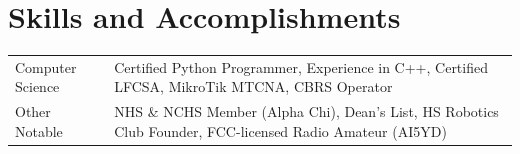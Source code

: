 \documentclass[a4paper,12pt]{article}
\begin{document}
\section{Skills and Accomplishments}
\begin{tabularx}{\linewidth}{@{}l X@{}}
Computer Science &  \normalsize{Certified Python Programmer, Experience in C++, Certified LFCSA, MikroTik MTCNA, CBRS Operator}\\
Other Notable &  \normalsize{NHS \& NCHS Member (Alpha Chi), Dean's List, HS Robotics Club Founder, FCC-licensed Radio Amateur (AI5YD)}\\
\end{tabularx}

\vfill
{}
\end{document}
